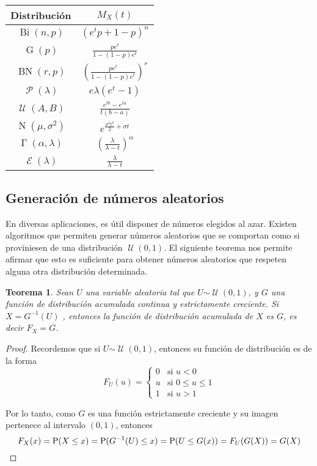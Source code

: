 \documentclass[11pt]{article}
\theoremstyle{plain}
\newtheorem*{teo}{Teorema}
\theoremstyle{definition}
\theoremstyle{remark}
\newcommand{\proba}{\ensuremath{\operatorname{P}}}  %
\newcommand{\dists}[1]{\ensuremath{\operatorname{#1}}}  %
\newcommand{\dist}[1]{\ensuremath{\sim \operatorname{#1}}}  %
\newcommand{\poisson}[0]{\ensuremath{\mathcal{P}}}  %
\newcommand{\unif}[0]{\ensuremath{\mathcal{U}}}  %
\newcommand{\exponen}[0]{\ensuremath{\mathcal{E}}}  %
\begin{document}
      \begin{center}
        \begin{tabular}{c | c}%
          Distribución                      & $\displaystyle M_X(t)$ \\ \hline
          $\dists{Bi}(n, p)$                & $\displaystyle \left( e^t p + 1 - p \right)^n$ \\
          $\dists{G}(p)$                    & $\displaystyle \frac{p e^t}{1 - (1 - p)e^t}$ \\
          $\dists{BN}(r,p)$                 & $\displaystyle \left( \frac{p e^t}{1 - (1 - p)e^t} \right)^r$ \\
          $\dists{\poisson}(\lambda)$       & $\displaystyle e{\lambda(e^t - 1)}$ \\
          $\dists{\unif}(A,B)$                  & $\displaystyle \frac{e^{tb} - e^{ta}}{t(b - a)}$ \\
          $\dists{N}(\mu,\sigma^2)$         & $\displaystyle e^{\frac{\sigma^2 t^2}{2} + \sigma t}$ \\
          $\dists{\Gamma}(\alpha,\lambda)$  & $\displaystyle \left( \frac{\lambda}{\lambda - t} \right)^\alpha$ \\
          $\dists{\exponen}(\lambda)$       & $\displaystyle \frac{\lambda}{\lambda - t}$
        \end{tabular}
      \end{center}

  \subsection{Generación de números aleatorios}
    En diversas aplicaciones, es útil disponer de números elegidos al azar. Existen algoritmos que permiten generar números aleatorios que se comportan como si proviniesen de una distribución $\dists{\unif}(0,1)$. El siguiente teorema nos permite afirmar que esto es suficiente para obtener números aleatorios que respeten alguna otra distribución determinada.

    \begin{teo}
      Sean $U$ una variable aleatoria tal que $U \dist{\unif}(0,1)$, y $G$ una función de distribución acumulada continua y estrictamente creciente. Si $X = G^{-1}(U)$ , entonces la función de distribución acumulada de $X$ es $G$, es decir $F_X = G$.
    \end{teo}
    \begin{proof}
      Recordemos que si $U \dist{\unif}(0,1)$, entonces su función de distribución es de la forma
      \[ F_U(u) = \begin{cases}
        0 & \text{si $u < 0$} \\
        \displaystyle u & \text{si $0 \leq u \leq 1$} \\
        1 & \text{si $u > 1$}
      \end{cases} \]

      Por lo tanto, como $G$ es una función estrictamente creciente y su imagen pertenece al intervalo $(0,1)$, entonces
      \[ F_X(x) = \proba(X \leq x) = \proba(G^{-1}(U) \leq x) = \proba(U \leq G(x)) = F_U(G(X)) = G(X) \qedhere \]
    \end{proof}
\end{document}
